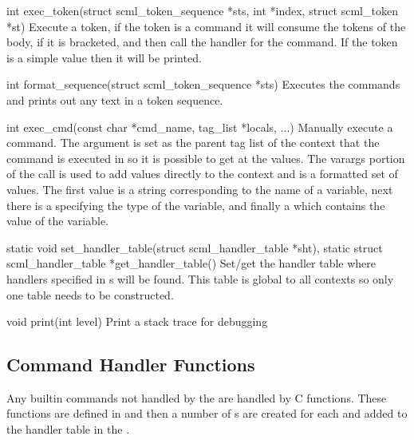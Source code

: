 \begin{cprototypelist}
  \item[int exec_token(struct scml_token_sequence *sts, int *index,
  struct scml_token *st)] Execute a token, if the token is a command it will
  consume the tokens of the body, if it is bracketed, and then call the handler
  for the command.  If the token is a simple value then it will be printed.

  \item[int format_sequence(struct scml_token_sequence *sts)]
  Executes the commands and prints out any text in a token sequence.

  \item[int exec_cmd(const char *cmd_name, tag_list *locals, ...)] Manually
  execute a command.  The  argument is set as the parent
  tag list of the context that the command is executed in so it is possible to
  get at the values.  The varargs portion of the call is used to add values
  directly to the context and is a formatted set of values.  The first value is
  a string corresponding to the name of a variable, next there is a
   specifying the type of the variable, and finally a
   which contains the value of the variable.

  \item[static void set_handler_table(struct scml_handler_table
  *sht), static struct scml_handler_table *get_handler_table()] Set/get the
  handler table where handlers specified in s will be found.
  This table is global to all contexts so only one table needs to be
  constructed.

  \item[void print(int level)] Print a stack trace for debugging
\end{cprototypelist}

\subsection{Command Handler Functions}

Any builtin commands not handled by the  are handled by C
functions.  These functions are defined in 
and then a number of s are created for each and added to
the handler table in the .


